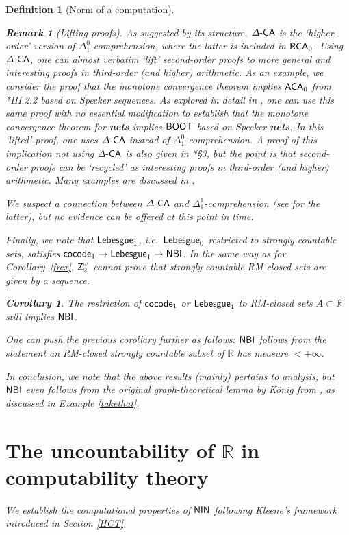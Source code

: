 \documentclass[reqno]{amsart}
\newtheorem{cor}[thm]{Corollary}
\newtheorem{defi}[thm]{Definition}
\newtheorem{rem}[thm]{Remark}
\def\Z{\textup{\textsf{Z}}}
\def\RCA{\textup{\textsf{RCA}}}
\def\R{{\mathbb  R}}
\def\di{\rightarrow}
\def\ACA{\textup{\textsf{ACA}}}
\def\LEB{\textup{\textsf{Lebesgue}}}
\def\cocode{\textup{\textsf{cocode}}}
\def\DCA{\Delta\textup{\textsf{-CA}}}
\def\NBI{\textup{\textsf{NBI}}}
\def\NIN{\textup{\textsf{NIN}}}
\def\BOOT{\textup{\textsf{BOOT}}}
\numberwithin{equation}{section}
\numberwithin{thm}{section}
\begin{document}
\begin{defi}[Norm of a computation]
\begin{rem}[Lifting proofs]
As suggested by its structure, $\DCA$ is the `higher-order' version of $\Delta_{1}^{0}$-comprehension, where the latter is included in $\RCA_{0}$.  
Using $\DCA$, one can almost verbatim `lift' second-order proofs to more general and interesting proofs in third-order (and higher) arithmetic.
As an example, we consider the proof that the \emph{monotone convergence theorem} implies $\ACA_{0}$ from \cite{simpson2}*{III.2.2} based on \emph{Specker sequences}.  
As explored in detail in \cites{samph, samFLO2, samrecount}, one can use this same proof \emph{with no essential modification} to establish that 
the \emph{monotone convergence theorem for \textbf{nets}} implies $\BOOT$ based on \emph{Specker \textbf{nets}}.
In this `lifted' proof, one uses $\DCA$ instead of $\Delta_{1}^{0}$-comprehension.  A proof of this implication \emph{not} using $\DCA$ is also given in \cite{samph}*{\S3}, but the point is that 
second-order proofs can be `recycled' as interesting proofs in third-order (and higher) arithmetic.  Many examples are discussed in \cite{samrecount, samFLO2}. 
\end{rem}
We suspect a connection between $\DCA$ and $\Delta_{1}^{1}$-comprehension (see \cite{simpson2} for the latter), but no evidence can be offered at this point in time.  

\smallskip

Finally, we note that $\LEB_{1}$, i.e.\  $\LEB_{0}$ restricted to strongly countable sets, satisfies $\cocode_{1}\di \LEB_{1}\di \NBI$.
In the same way as for Corollary~\ref{frex}, $\Z_{2}^{\omega}$ cannot prove that strongly countable RM-closed sets are given by a sequence.  
\begin{cor}\label{frex2}
The restriction of $\cocode_{1}$ or $\LEB_{1}$ to RM-closed sets $A\subset \R$ still implies $\NBI$.
\end{cor}
One can push the previous corollary further as follows: $\NBI$ follows from the statement \emph{an RM-closed strongly countable subset of $\R$ has measure $<+\infty$.}

\smallskip

In conclusion, we note that the above results (mainly) pertains to analysis, but $\NBI$ even follows from the {original} \emph{graph-theoretical} lemma by K\"onig from \cite{koning147}, as discussed in Example \ref{takethat}.  

\section{The uncountability of $\R$ in computability theory}
We establish the computational properties of $\NIN$ following Kleene's framework introduced in Section \ref{HCT}.  

\end{defi}
\end{document}
